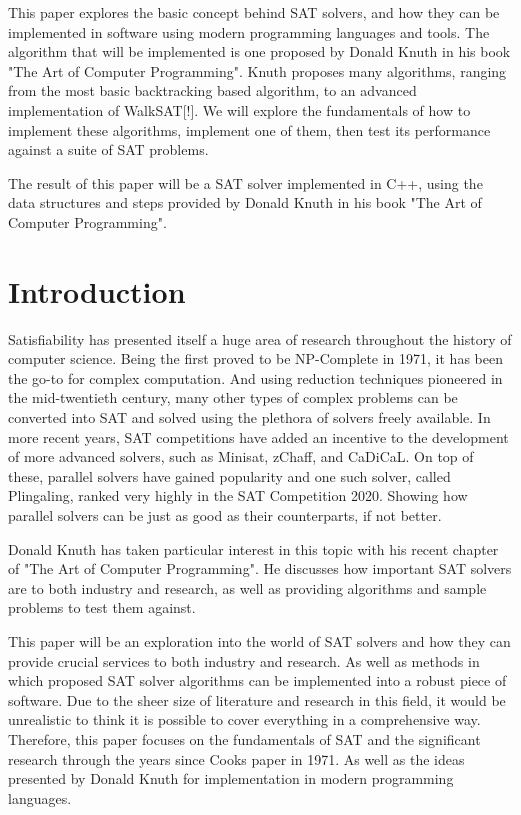 \documentclass{article}
\begin{document}
This paper explores the basic concept behind SAT solvers, and how they can be implemented in
software using modern programming languages and tools. The algorithm that will be
implemented is one proposed by Donald Knuth in his book "The Art of Computer Programming". Knuth proposes
many algorithms, ranging from the most basic backtracking based algorithm, to an advanced
implementation of WalkSAT[!]. We will explore the fundamentals of how to implement these algorithms,
implement one of them, then test its performance against a suite of SAT problems.

The result of this paper will be a SAT solver implemented in C++, using the data structures and
steps provided by Donald Knuth in his book "The Art of Computer Programming".

\newpage
\thispagestyle{empty}
\tableofcontents

\newpage
\section{Introduction}
Satisfiability has presented itself a huge area of research throughout the history of computer
science. Being the first proved to be NP-Complete in 1971\cite{scook}, it has been the go-to for complex
computation. And using reduction techniques pioneered in the mid-twentieth century, many other types
of complex problems can be converted into SAT and solved using the plethora of solvers freely
available. In more recent years, SAT competitions have added an incentive to the development of more
advanced solvers, such as Minisat, zChaff, and CaDiCaL. On top of these, parallel solvers have
gained popularity and one such solver, called Plingaling, ranked very highly in the SAT Competition
2020. Showing how parallel solvers can be just as good as their counterparts, if not better.

Donald Knuth has taken particular interest in this topic with his recent chapter of "The Art of Computer Programming". He discusses how important SAT solvers are to both industry and research, as well as providing algorithms and sample problems to test them against.

This paper will be an exploration into the world of SAT solvers and how they can provide crucial services to both industry and research. As well as methods in which proposed SAT solver algorithms can be implemented into a robust piece of software. Due to the sheer size of literature and research in this field, it would be unrealistic to think it is possible to cover everything in a comprehensive way. Therefore, this paper focuses on the fundamentals of SAT and the significant research through the years since Cooks paper in 1971\cite{scook}. As well as the ideas presented by Donald Knuth for implementation in modern programming languages.
\end{document}
